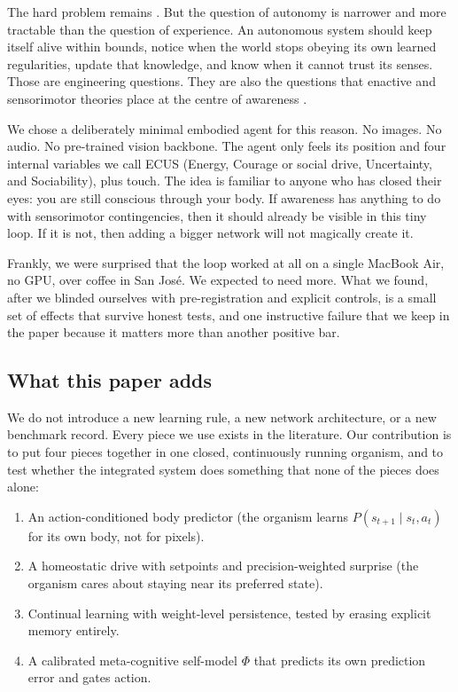 \documentclass[11pt,a4paper]{article}
\begin{document}
The hard problem remains \cite{chalmers1995}. But the question of autonomy is narrower and more tractable than the question of experience. An autonomous system should keep itself alive within bounds, notice when the world stops obeying its own learned regularities, update that knowledge, and know when it cannot trust its senses. Those are engineering questions. They are also the questions that enactive and sensorimotor theories place at the centre of awareness \cite{oregan2001, thompson2007}.

We chose a deliberately minimal embodied agent for this reason. No images. No audio. No pre-trained vision backbone. The agent only feels its position and four internal variables we call ECUS (Energy, Courage or social drive, Uncertainty, and Sociability), plus touch. The idea is familiar to anyone who has closed their eyes: you are still conscious through your body. If awareness has anything to do with sensorimotor contingencies, then it should already be visible in this tiny loop. If it is not, then adding a bigger network will not magically create it.

Frankly, we were surprised that the loop worked at all on a single MacBook Air, no GPU, over coffee in San Jos\'e. We expected to need more. What we found, after we blinded ourselves with pre-registration and explicit controls, is a small set of effects that survive honest tests, and one instructive failure that we keep in the paper because it matters more than another positive bar.

\subsection{What this paper adds}

We do not introduce a new learning rule, a new network architecture, or a new benchmark record. Every piece we use exists in the literature. Our contribution is to put four pieces together in one closed, continuously running organism, and to test whether the integrated system does something that none of the pieces does alone:

\begin{enumerate}[leftmargin=1.2em]
    \item An action-conditioned body predictor (the organism learns $P(s_{t+1} \mid s_t, a_t)$ for its own body, not for pixels).
    \item A homeostatic drive with setpoints and precision-weighted surprise (the organism cares about staying near its preferred state).
    \item Continual learning with weight-level persistence, tested by erasing explicit memory entirely.
    \item A calibrated meta-cognitive self-model $\Phi$ that predicts its own prediction error and gates action.
\end{enumerate}
\end{document}
